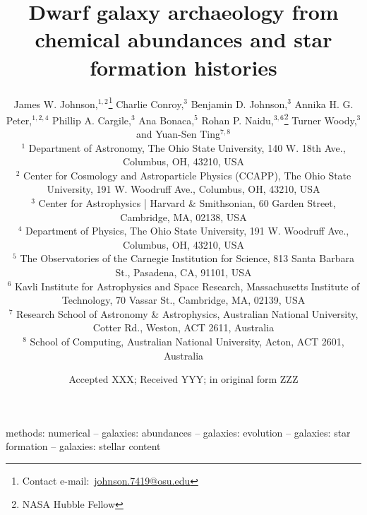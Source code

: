 \documentclass[fleqn, usenatbib]{mnras}
\title[Dwarf Galaxy Archaeology]{Dwarf galaxy archaeology from chemical
abundances and star formation histories}
\author[J.W. Johnson et al.]{James W. Johnson,$^{1, 2}$\thanks{
	Contact e-mail:~\href{mailto:johnson.7419@osu.edu}{johnson.7419@osu.edu}}
	Charlie Conroy,$^{3}$
	Benjamin D. Johnson,$^{3}$
	Annika H. G. Peter,$^{1, 2, 4}$
	\newauthor
	Phillip A. Cargile,$^{3}$
	Ana Bonaca,$^{5}$
	Rohan P. Naidu,$^{3, 6}$\thanks{NASA Hubble Fellow}
	Turner Woody,$^{3}$
	and Yuan-Sen Ting$^{7, 8}$
	\\
	$^{1}$ Department of Astronomy, The Ohio State University,
	140 W. 18th Ave., Columbus, OH, 43210, USA
	\\
	$^{2}$ Center for Cosmology and Astroparticle Physics (CCAPP),
	The Ohio State University, 191 W. Woodruff Ave., Columbus, OH, 43210, USA
	\\
	$^{3}$ Center for Astrophysics | Harvard \& Smithsonian, 60 Garden Street,
	Cambridge, MA, 02138, USA
	\\
	$^{4}$ Department of Physics, The Ohio State University, 191 W. Woodruff
	Ave., Columbus, OH, 43210, USA
	\\
	$^{5}$ The Observatories of the Carnegie Institution for Science, 813 Santa
	Barbara St., Pasadena, CA, 91101, USA
	\\
	$^{6}$ Kavli Institute for Astrophysics and Space Research, Massachusetts
	Institute of Technology, 70 Vassar St., Cambridge, MA, 02139, USA
	\\
	$^{7}$ Research School of Astronomy \& Astrophysics, Australian National
	University, Cotter Rd., Weston, ACT 2611, Australia
	\\
	$^{8}$ School of Computing, Australian National University, Acton, ACT
	2601, Australia
}
\date{Accepted XXX; Received YYY; in original form ZZZ}
\begin{document}
\label{firstpage}
\pagerange{\pageref{firstpage}--\pageref{lastpage}}
\maketitle



\begin{keywords}
methods: numerical -- galaxies: abundances -- galaxies: evolution --
galaxies: star formation -- galaxies: stellar content
\end{keywords}













\begin{appendices}


\end{appendices}

\label{lastpage}
\end{document}
